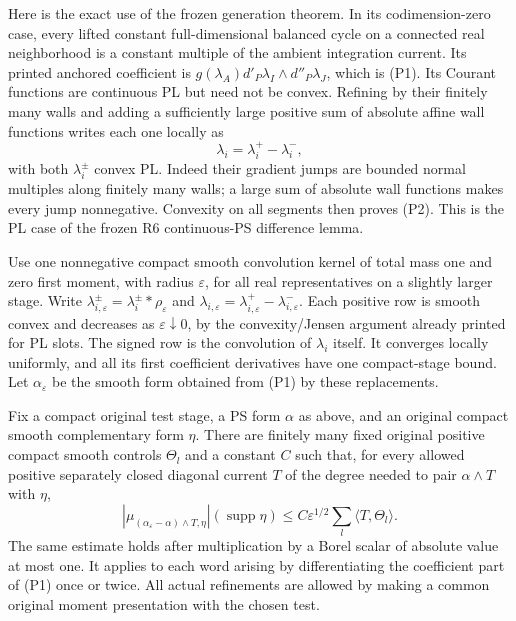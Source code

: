 Here is the exact use of the frozen generation theorem.  In its
codimension-zero case, every lifted constant full-dimensional
balanced cycle on a connected real neighborhood is a constant
multiple of the ambient integration current.  Its printed anchored
coefficient is $g(\lambda_A)d'_P\lambda_I\wedge d''_P\lambda_J$,
which is (P1).  Its Courant functions are continuous PL but need not
be convex.  Refining by their finitely many walls and adding a
sufficiently large positive sum of absolute affine wall functions
writes each one locally as
\[
                         \lambda_i=\lambda_i^+-\lambda_i^-,
 \tag{P2}
\]
with both $\lambda_i^\pm$ convex PL.  Indeed their gradient jumps
are bounded normal multiples along finitely many walls; a large
sum of absolute wall functions makes every jump nonnegative.
Convexity on all segments then proves (P2).  This is the PL case
of the frozen R6 continuous-PS difference lemma.

Use one nonnegative compact smooth convolution kernel of total mass
one and zero first moment, with radius $\varepsilon$, for all real representatives on a
slightly larger stage.  Write
$\lambda_{i,\varepsilon}^\pm=\lambda_i^\pm*\rho_\varepsilon$ and
$\lambda_{i,\varepsilon}=\lambda_{i,\varepsilon}^+
                       -\lambda_{i,\varepsilon}^-$.
Each positive row is smooth convex and decreases as
$\varepsilon\downarrow0$, by the convexity/Jensen argument already
printed for PL slots.  The signed row is the convolution of
$\lambda_i$ itself.  It converges locally uniformly, and all its
first coefficient derivatives have one compact-stage bound.
Let $\alpha_\varepsilon$ be the smooth form obtained from (P1)
by these replacements.

\begin{lemma}
\label{lem:r10-pws-word-uniform-error}
Fix a compact original test stage, a PS form $\alpha$ as above,
and an original compact smooth complementary form $\eta$.
There are finitely many fixed original positive compact smooth
controls $\Theta_l$ and a constant $C$ such that, for every
allowed positive separately closed diagonal current $T$ of the
degree needed to pair $\alpha\wedge T$ with $\eta$,
\[
 \left|\mu_{(\alpha_\varepsilon-\alpha)\wedge T,\eta}\right|
        (\operatorname{supp}\eta)
 \le C\varepsilon^{1/2}\sum_l\langle T,\Theta_l\rangle.
 \tag{P3}
\]
The same estimate holds after multiplication by a Borel scalar
of absolute value at most one.  It applies to each word arising
by differentiating the coefficient part of (P1) once or twice.
All actual refinements are allowed by making a common original
moment presentation with the chosen test.
\end{lemma}

